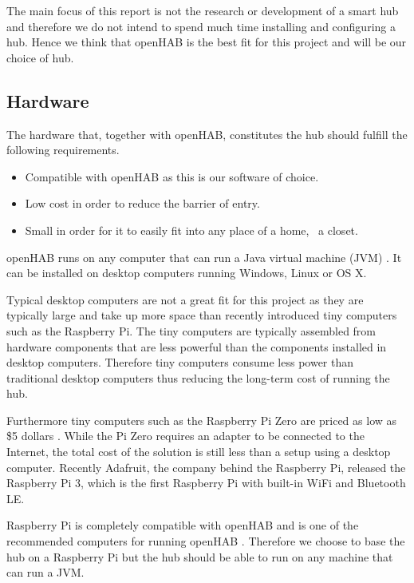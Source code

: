 The main focus of this report is not the research or development of a smart hub and therefore we do not intend to spend much time installing and configuring a hub. Hence we think that openHAB is the best fit for this project and will be our choice of hub.

\subsection{Hardware}

The hardware that, together with openHAB, constitutes the hub should fulfill the following requirements.

\begin{itemize}
\item Compatible with openHAB as this is our software of choice.
\item Low cost in order to reduce the barrier of entry.
\item Small in order for it to easily fit into any place of a home, \eg~a closet.
\end{itemize}

openHAB runs on any computer that can run a Java virtual machine (JVM) \cite{openhab:introduction}. It can be installed on desktop computers running Windows, Linux or OS X.

Typical desktop computers are not a great fit for this project as they are typically large and take up more space than recently introduced tiny computers such as the Raspberry Pi. The tiny computers are typically assembled from hardware components that are less powerful than the components installed in desktop computers. Therefore tiny computers consume less power than traditional desktop computers thus reducing the long-term cost of running the hub.

Furthermore tiny computers such as the Raspberry Pi Zero are priced as low as \$5 dollars \cite{raspberrypi:zero}. While the Pi Zero requires an adapter to be connected to the Internet, the total cost of the solution is still less than a setup using a desktop computer. Recently Adafruit, the company behind the Raspberry Pi, released the Raspberry Pi 3, which is the first Raspberry Pi with built-in WiFi and Bluetooth LE.

Raspberry Pi is completely compatible with openHAB and is one of the recommended computers for running openHAB \cite{openhab:hardware}. Therefore we choose to base the hub on a Raspberry Pi but the hub should be able to run on any machine that can run a JVM.

